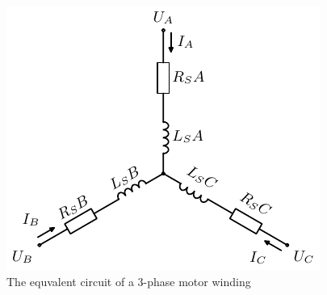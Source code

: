 \begin{figure}[htb]
\begingroup
\tikzset{}
 \centerline{\includegraphics[width=.35\columnwidth]{.//Figure/threephase_winding.pdf}}
 \endgroup
 \caption{The equvalent circuit of a 3-phase motor winding}
 \label{fig:threephase_winding}
\end{figure}